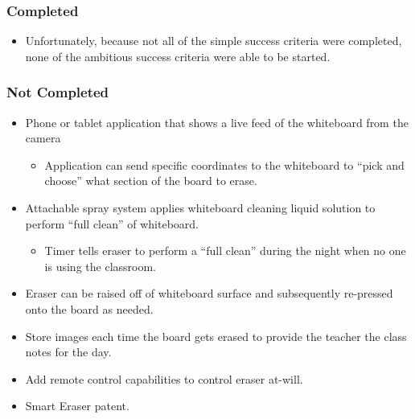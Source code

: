 \subsubsection{Completed}
\begin{itemize}
	\item Unfortunately, because not all of the simple success criteria were completed, none of the ambitious success criteria were able to be started.\\
\end{itemize}
\subsubsection{Not Completed}
 \begin{itemize}
 	\item Phone or tablet application that shows a live feed of the whiteboard from the camera
 		\begin{itemize}
 		\item Application can send specific coordinates to the whiteboard to ``pick and choose'' what section of the board to erase.
 		\end{itemize}
 	\item Attachable spray system applies whiteboard cleaning liquid solution to perform ``full clean'' of whiteboard.
 		\begin{itemize}
		\item Timer tells eraser to perform a ``full clean'' during the night when no one is using the classroom.
		\end{itemize}
 	\item Eraser can be raised off of whiteboard surface and subsequently re-pressed onto the board as needed.
 	\item Store images each time the board gets erased to provide the teacher the class notes for the day.
 	\item Add remote control capabilities to control eraser at-will.
 	\item Smart Eraser patent.
 \end{itemize}

